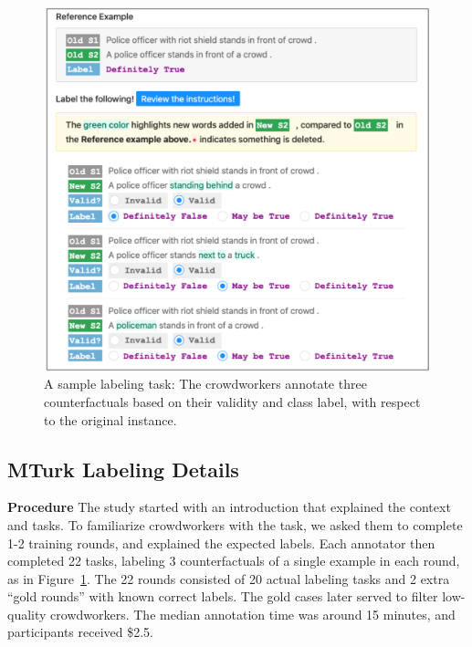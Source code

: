 \begin{figure}
\centering
\includegraphics[width=0.9\columnwidth]{figures/mturk_label}
\vspace{-5pt}
\caption{A sample labeling task: The crowdworkers annotate three counterfactuals based on their validity and class label, with respect to the original instance.}
\vspace{-15pt}
\label{fig:mturk_ui}
\end{figure}



\subsection{MTurk Labeling Details}
\label{appendix:label_instruct}


\textbf{Procedure}
The study started with an introduction that explained the context and tasks.
To familiarize crowdworkers with the task, we asked them to complete 1-2 training rounds, and explained the expected labels.
Each annotator then completed 22 tasks, labeling 3 counterfactuals of a single example in each round, as in Figure~\ref{fig:mturk_ui}.
The 22 rounds consisted of 20 actual labeling tasks and 2 extra ``gold rounds'' with known correct labels.
The gold cases later served to filter low-quality crowdworkers.
The median annotation time was around 15 minutes, and participants received \$2.5.

